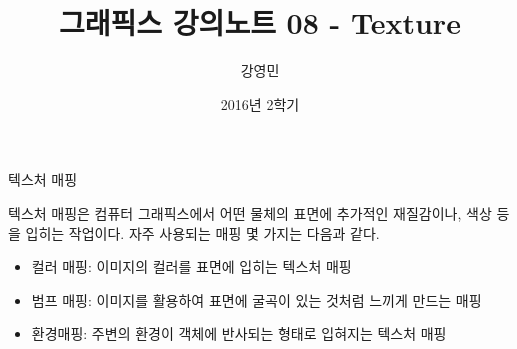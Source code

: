 \documentclass{beamer}
\title[3D 그래픽스 프로그래밍]{그래픽스 강의노트 08 - Texture}
\author{강영민}
\institute{동명대학교}
\date{2016년 2학기}
\begin{document}
\begin{frame}
  \titlepage
\end{frame}





\begin{frame}[fragile]{텍스처 매핑}

텍스처 매핑은 컴퓨터 그래픽스에서 어떤 물체의 표면에 추가적인 재질감이나, 색상 등을 입히는 작업이다.  자주 사용되는 매핑 몇 가지는 다음과 같다.

\begin{itemize}
\item 컬러 매핑: 이미지의 컬러를 표면에 입히는 텍스처 매핑
\item 범프 매핑: 이미지를 활용하여 표면에 굴곡이 있는 것처럼 느끼게 만드는 매핑
\item 환경매핑: 주변의 환경이 객체에 반사되는 형태로 입혀지는 텍스처 매핑
\end{itemize}

\end{frame}
\end{document}
